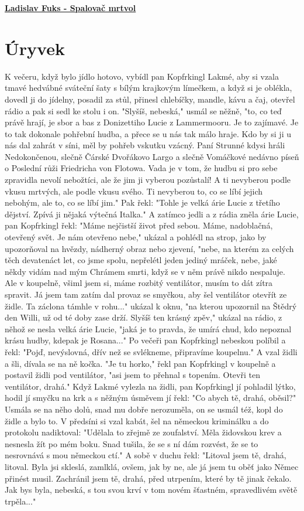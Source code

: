\documentclass[11pt]{article}
\begin{document}
    \begin{center}
        \underline{\textbf{\Huge Ladislav Fuks - Spalovač mrtvol}}
    \end{center}
    \section*{Úryvek}
    K večeru, když bylo jídlo hotovo, vybídl pan Kopfrkingl Lakmé, aby si vzala tmavé hedvábné sváteční šaty s bílým krajkovým límečkem, a když si je oblékla, dovedl ji do jídelny, posadil za stůl, přinesl chlebíčky, mandle, kávu a čaj, otevřel rádio a pak si sedl ke stolu i on.
"Slyšíš, nebeská," usmál se něžně, "to, co teď právě hrají, je sbor a bas z Donizettiho Lucie z Lammermooru. Je to zajímavé. Je to tak dokonale pohřební hudba, a přece se u nás tak málo hraje. Kdo by si ji u nás dal zahrát v síni, měl by pohřeb vskutku vzácný. Paní Strunné kdysi hráli Nedokončenou, slečně Čárské Dvořákovo Largo a slečně Vomáčkové nedávno píseň o Poslední růži Friedricha von Flotowa. Vada je v tom, že hudbu si pro sebe zpravidla nevolí nebožtíci, ale že jim ji vyberou pozůstalí! A ti nevyberou podle vkusu mrtvých, ale podle vkusu svého. Ti nevyberou to, co se líbí jejich nebohým, ale to, co se líbí jim." Pak řekl: "Tohle je velká árie Lucie z třetího dějství. Zpívá ji nějaká výtečná Italka." A zatímco jedli a z rádia zněla árie Lucie, pan Kopfrkingl řekl: "Máme nejčistší život před sebou. Máme, nadoblačná, otevřený svět. Je nám otevřeno nebe," ukázal a pohlédl na strop, jako by upozorňoval na hvězdy, nádherný obraz nebo zjevení, "nebe, na kterém za celých těch devatenáct let, co jsme spolu, nepřelétl jeden jediný mráček, nebe, jaké někdy vidám nad mým Chrámem smrti, když se v něm právě nikdo nespaluje. Ale v koupelně, všiml jsem si, máme rozbitý ventilátor, musím to dát zítra spravit. Já jsem tam zatím dal provaz se smyčkou, aby šel ventilátor otevřít ze židle. Ta záclona támhle v rohu..." ukázal k oknu, "na kterou upozornil na Štědrý den Willi, už od té doby zase drží. Slyšíš ten krásný zpěv," ukázal na rádio, z něhož se nesla velká árie Lucie, "jaká je to pravda, že umírá chud, kdo nepoznal krásu hudby, kdepak je Rosana..."
Po večeři pan Kopfrkingl nebeskou políbil a řekl: "Pojď, nevýslovná, dřív než se svlékneme, připravíme koupelnu." A vzal židli a šli, dívala se na ně kočka. "Je tu horko," řekl pan Kopfrkingl v koupelně a postavil židli pod ventilátor, "asi jsem to přehnal s topením. Otevři ten ventilátor, drahá."
Když Lakmé vylezla na židli, pan Kopfrkingl jí pohladil lýtko, hodil jí smyčku na krk a s něžným úsměvem jí řekl: "Co abych tě, drahá, oběsil?" Usmála se na něho dolů, snad mu dobře nerozuměla, on se usmál též, kopl do židle a bylo to. V předsíni si vzal kabát, šel na německou kriminálku a do protokolu nadiktoval: "Udělala to zřejmě ze zoufalství. Měla židovskou krev a nesnesla žít po mém boku. Snad tušila, že se s ní dám rozvést, že se to nesrovnává s mou německou ctí." A sobě v duchu řekl: "Litoval jsem tě, drahá, litoval. Byla jsi skleslá, zamlklá, ovšem, jak by ne, ale já jsem tu oběť jako Němec přinést musil. Zachránil jsem tě, drahá, před utrpením, které by tě jinak čekalo. Jak bys byla, nebeská, s tou svou krví v tom novém šťastném, spravedlivém světě trpěla..."
\end{document}

